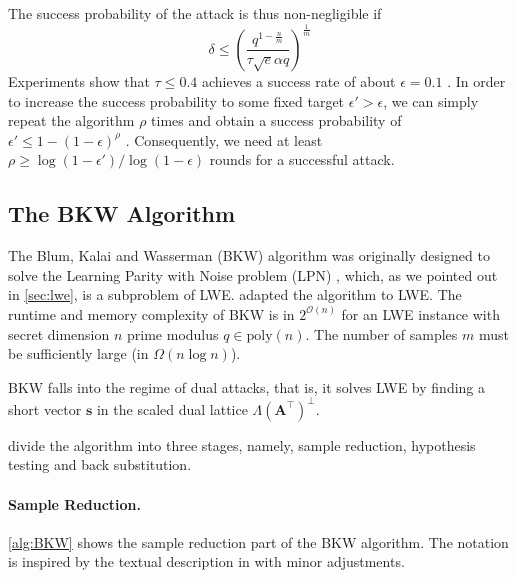 The success probability of the attack is thus non-negligible if
\begin{equation}
  \delta \leq \left(\frac{q^{1-\frac{n}{m}}}{\tau \sqrt{e} \alpha q}\right)^{\frac{1}{m}}
\end{equation}
Experiments show that $\tau \leq 0.4$ achieves a success rate of about $\epsilon = 0.1$ \cite{AFG13}. In order to increase the success probability to some fixed target $\epsilon' > \epsilon$, we can simply repeat the algorithm $\rho$ times and obtain a success probability of $\epsilon' \leq 1 - (1 - \epsilon)^\rho$ \cite{BBGS19}. Consequently, we need at least $\rho \geq \log(1-\epsilon')/\log(1-\epsilon)$ rounds for a successful attack.

\subsection[The BKW Algorithm]{The BKW Algorithm \cite{BKW03}}
The Blum, Kalai and Wasserman (BKW) algorithm was originally designed to solve the Learning Parity with Noise problem (LPN) \cite{BKW03}, which, as we pointed out in \cref{sec:lwe}, is a subproblem of LWE. \citet{ACFFP15a} adapted the algorithm to LWE. The runtime and memory complexity of BKW is in $2^{\mathcal{O}(n)}$ for an LWE instance with secret dimension $n$ prime modulus $q \in \text{poly}(n)$. The number of samples $m$ must be sufficiently large (in $\Omega(n \log n)$). %

BKW falls into the regime of dual attacks, that is, it solves LWE by finding a short vector $\mathbf{s}$ in the scaled dual lattice $\Lambda(\mathbf{A}^\intercal)^{\perp}$.


\citet{ACFFP15a} divide the algorithm into three stages, namely, sample reduction, hypothesis testing and back substitution.

\paragraph{Sample Reduction.} \cref{alg:BKW} shows the sample reduction part of the BKW algorithm. The notation is inspired by the textual description in \cite{GJS15} with minor adjustments.

